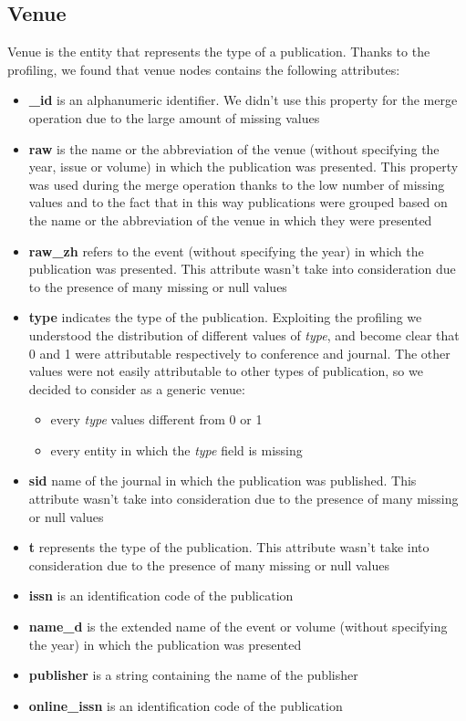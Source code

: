 \documentclass{Configuration_Files/PoliMi3i_thesis}
\begin{document}
\subsection{Venue}
Venue is the entity that represents the type of a publication. Thanks to the profiling, we found that venue nodes contains
the following attributes:
\begin{itemize}
    \item \textbf{\_id} is an alphanumeric identifier. We didn't use this property for the merge operation due to the large
            amount of missing values
    \item \textbf{raw} is the name or the abbreviation of the venue (without specifying the year, issue or volume) in which the
            publication was presented. This property was used during the merge operation thanks to the low number of missing
            values and to the fact that in this way publications were grouped based on the name or the abbreviation
            of the venue in which they were presented
    \item \textbf{raw\_zh} refers to the event (without specifying the year) in which the publication was presented. 
            This attribute wasn't take into consideration due to the presence of many missing or null values
    \item \textbf{type} indicates the type of the publication. Exploiting the profiling we understood the distribution
            of different values of \emph{type}, and become clear that 0 and 1 were attributable respectively to conference
            and journal. The other values were not easily attributable to other types of publication, so we decided to consider
            as a generic venue:
            \begin{itemize}
                \item every \emph{type} values different from 0 or 1
                \item every entity in which the \emph{type} field is missing
            \end{itemize} 
    \item \textbf{sid} name of the journal in which the publication was published. This attribute wasn't take into
            consideration due to the presence of many missing or null values
    \item \textbf{t} represents the type of the publication. This attribute wasn't take into consideration due to the
            presence of many missing or null values
    \item \textbf{issn} is an identification code of the publication
    \item \textbf{name\_d} is the extended name of the event or volume (without specifying the year) in which the
            publication was presented
    \item \textbf{publisher} is a string containing the name of the publisher
    \item \textbf{online\_issn} is an identification code of the publication
\end{itemize}
\end{document}
